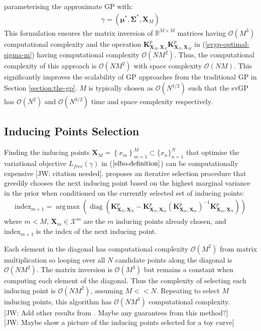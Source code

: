\documentclass{article}
\newcommand{\jw}[1]{{\color{gray} [JW: #1]}}
\newcommand{\diag}{\operatorname{diag}}
\DeclareMathOperator*{\argmax}{arg\,max}
\numberwithin{equation}{section}
\begin{document}
parameterising the approximate GP with:
\begin{align}
    \gamma = \left(\boldsymbol{\mu}^*, \mathbf{\Sigma}^*,  \mathbf{X}_M\right)
    \label{titsias-svgp-parameters}
\end{align}
This formulation ensures the matrix inversion of $\mathbb{R}^{M \times M}$ matrices having $\mathcal{O}\left(M^3\right)$ computational complexity and the operation $\mathbf{K}^p_{\mathbf{X}_M, \mathbf{X}_N} \mathbf{K}^p_{\mathbf{X}_N, \mathbf{X}_M} $ in (\ref{svgp-optimal-sigma-m}) having computational complexity $\mathcal{O}\left(NM^2\right)$. Thus, the computational complexity of this approach is $\mathcal{O}\left(NM^2\right)$ with space complexity $\mathcal{O}\left(NM\right)$. This significantly improves the scalability of GP approaches from the traditional GP in Section \ref{section:the-gp}. $M$ is typically chosen as $\mathcal{O}(N^{1/2})$ such that the svGP has $\mathcal{O}(N^{2})$ and $\mathcal{O}(N^{3/2})$ time and space complexity respectively.

\subsection{Inducing Points Selection}
Finding the inducing points $\mathbf{X}_M = \left\{x_m\right\}_{m=1}^{M} \subset \{x_n\}_{n=1}^{N}$ that optimise the variational objective $L_{free}(\gamma)$ in ($\ref{elbo-definition}$) can be computationally expensive \jw{citation needed}. \cite{burt2020convergence} proposes an iterative selection procedure that greedily chooses the next inducing point based on the highest marginal variance in the prior when conditioned on the currently selected set of inducing points:
\begin{align}
    \label{greedy-varaince-selection}
    \text{index}_{m+1} = \argmax \left(\diag \left(\mathbf{K}^p_{\mathbf{X}_N, \mathbf{X}_N} - \mathbf{K}^p_{\mathbf{X}_N, \mathbf{X}_{m}} \left(\mathbf{K}^p_{\mathbf{X}_{m}, \mathbf{X}_{m}}\right)^{-1}\mathbf{K}^p_{\mathbf{X}_{m}, \mathbf{X}_N}\right)\right)
\end{align}
where $m < M$, $\mathbf{X}_{m} \in \mathcal{X}^m$ are the $m$ inducing points already chosen, and $\text{index}_{m+1}$ is the index of the next inducing point.

Each element in the diagonal has computational complexity $\mathcal{O}(M^2)$ from matrix multiplication so looping over all $N$ candidate points along the diagonal is $\mathcal{O}(NM^2)$. The matrix inversion is $\mathcal{O}(M^3)$ but remains a constant when computing each element of the diagonal. Thus the complexity of selecting each inducing point is $\mathcal{O}(NM^2)$, assuming $M << N$. Repeating to select $M$ inducing points, this algorithm has $\mathcal{O}(NM^3)$ computational complexity.
\\\jw{Add other results from \cite{burt2020convergence}. Maybe any guarantees from this method?}
\\\jw{Maybe show a picture of the inducing points selected for a toy curve}
\end{document}
